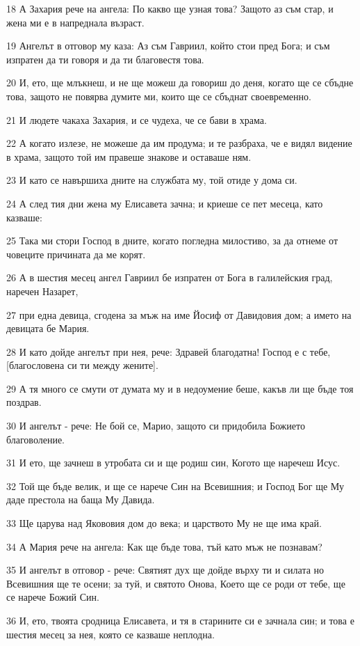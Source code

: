 \par 18 А Захария рече на ангела: По какво ще узная това? Защото аз съм стар, и жена ми е в напреднала възраст.
\par 19 Ангелът в отговор му каза: Аз съм Гавриил, който стои пред Бога; и съм изпратен да ти говоря и да ти благовестя това.
\par 20 И, ето, ще млъкнеш, и не ще можеш да говориш до деня, когато ще се сбъдне това, защото не повярва думите ми, които ще се сбъднат своевременно.
\par 21 И людете чакаха Захария, и се чудеха, че се бави в храма.
\par 22 А когато излезе, не можеше да им продума; и те разбраха, че е видял видение в храма, защото той им правеше знакове и оставаше ням.
\par 23 И като се навършиха дните на службата му, той отиде у дома си.
\par 24 А след тия дни жена му Елисавета зачна; и криеше се пет месеца, като казваше:
\par 25 Така ми стори Господ в дните, когато погледна милостиво, за да отнеме от човеците причината да ме корят.
\par 26 А в шестия месец ангел Гавриил бе изпратен от Бога в галилейския град, наречен Назарет,
\par 27 при една девица, сгодена за мъж на име Йосиф от Давидовия дом; а името на девицата бе Мария.
\par 28 И като дойде ангелът при нея, рече: Здравей благодатна! Господ е с тебе, [благословена си ти между жените].
\par 29 А тя много се смути от думата му и в недоумение беше, какъв ли ще бъде тоя поздрав.
\par 30 И ангелът - рече: Не бой се, Марио, защото си придобила Божието благоволение.
\par 31 И ето, ще зачнеш в утробата си и ще родиш син, Когото ще наречеш Исус.
\par 32 Той ще бъде велик, и ще се нарече Син на Всевишния; и Господ Бог ще Му даде престола на баща Му Давида.
\par 33 Ще царува над Якововия дом до века; и царството Му не ще има край.
\par 34 А Мария рече на ангела: Как ще бъде това, тъй като мъж не познавам?
\par 35 И ангелът в отговор - рече: Святият дух ще дойде върху ти и силата но Всевишния ще те осени; за туй, и святото Онова, Което ще се роди от тебе, ще се нарече Божий Син.
\par 36 И, ето, твоята сродница Елисавета, и тя в старините си е зачнала син; и това е шестия месец за нея, която се казваше неплодна.
